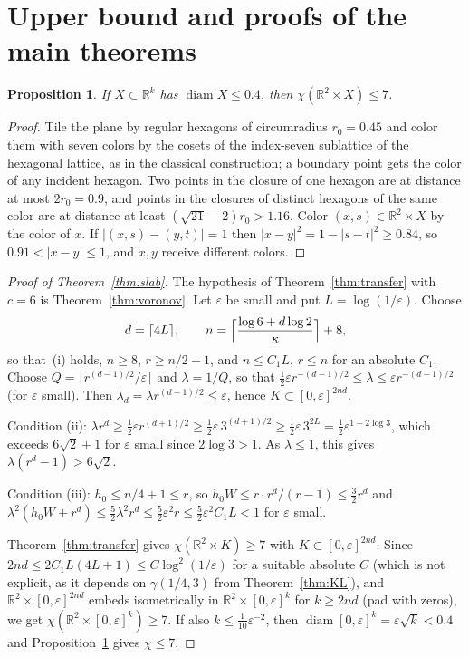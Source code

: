 \documentclass[11pt]{amsart}
\newtheorem{proposition}[theorem]{Proposition}
\theoremstyle{definition}
\theoremstyle{remark}
\newcommand{\R}{\mathbb{R}}
\begin{document}
\section{Upper bound and proofs of the main theorems}

\begin{proposition}\label{prop:upper}
If $X\subset\R^k$ has $\operatorname{diam}X\le0.4$, then $\chi(\R^2\times X)\le7$.
\end{proposition}

\begin{proof}
Tile the plane by regular hexagons of circumradius $r_0=0.45$ and color them with seven colors
by the cosets of the index-seven sublattice of the hexagonal lattice, as in the classical
construction; a boundary point gets the color of any incident hexagon. Two points in the closure
of one hexagon are at distance at most $2r_0=0.9$, and points in the closures of distinct
hexagons of the same color are at distance at least $(\sqrt{21}-2)r_0>1.16$. Color
$(x,s)\in\R^2\times X$ by the color of $x$. If $|(x,s)-(y,t)|=1$ then
$|x-y|^2=1-|s-t|^2\ge0.84$, so $0.91<|x-y|\le1$, and $x,y$ receive different colors.
\end{proof}

\begin{proof}[Proof of Theorem~\ref{thm:slab}]
The hypothesis of Theorem~\ref{thm:transfer} with $c=6$ is Theorem~\ref{thm:voronov}. Let
$\varepsilon$ be small and put $L=\log(1/\varepsilon)$. Choose
\[
  d=\lceil 4L\rceil,\qquad n=\Bigl\lceil\frac{\log 6+d\log2}{\kappa}\Bigr\rceil+8,
\]
so that~(i) holds, $n\ge8$, $r\ge n/2-1$, and $n\le C_1L$, $r\le n$ for an absolute $C_1$.
Choose $Q=\lceil r^{(d-1)/2}/\varepsilon\rceil$ and $\lambda=1/Q$, so that
$\tfrac12\varepsilon r^{-(d-1)/2}\le\lambda\le\varepsilon r^{-(d-1)/2}$ (for $\varepsilon$
small). Then $\lambda_d=\lambda r^{(d-1)/2}\le\varepsilon$, hence
$K\subset[0,\varepsilon]^{2nd}$.

Condition (ii): $\lambda r^d\ge\tfrac12\varepsilon r^{(d+1)/2}\ge\tfrac12\varepsilon\,3^{(d+1)/2}
\ge\tfrac12\varepsilon\,3^{2L}=\tfrac12\varepsilon^{1-2\log3}$, which exceeds $6\sqrt2+1$ for
$\varepsilon$ small since $2\log3>1$. As $\lambda\le1$, this gives $\lambda(r^d-1)>6\sqrt2$.

Condition (iii): $h_0\le n/4+1\le r$, so $h_0W\le r\cdot r^d/(r-1)\le\tfrac32r^d$ and
$\lambda^2(h_0W+r^d)\le\tfrac52\lambda^2r^d\le\tfrac52\varepsilon^2r\le\tfrac52\varepsilon^2C_1L<1$
for $\varepsilon$ small.

Theorem~\ref{thm:transfer} gives $\chi(\R^2\times K)\ge7$ with $K\subset[0,\varepsilon]^{2nd}$.
Since $2nd\le 2C_1L(4L+1)\le C\log^2(1/\varepsilon)$ for a suitable absolute $C$ (which is
not explicit, as it depends on $\gamma(1/4,3)$ from Theorem~\ref{thm:KL}), and
$\R^2\times[0,\varepsilon]^{2nd}$ embeds isometrically in $\R^2\times[0,\varepsilon]^k$ for
$k\ge2nd$ (pad with zeros), we get $\chi(\R^2\times[0,\varepsilon]^k)\ge7$. If also
$k\le\tfrac1{10}\varepsilon^{-2}$, then $\operatorname{diam}[0,\varepsilon]^k=\varepsilon\sqrt k<0.4$
and Proposition~\ref{prop:upper} gives $\chi\le7$.
\end{proof}
\end{document}
